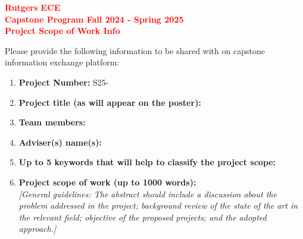 \documentclass{article}
\begin{document}
\begin{center}
    \textcolor{red}{\textbf{\Large Rutgers ECE}} \\

    \vspace{1em}
    \textcolor{red}{\textbf{\Large Capstone Program Fall 2024 - Spring 2025}} \\

    \vspace{1em}
    \textcolor{red}{\textbf{\Large Project Scope of Work Info}} \\
\end{center}

\vspace{1em}
\noindent Please provide the following information to be shared with on capstone information exchange platform:

\vspace{2em}
\begin{enumerate}[leftmargin=1.5cm]
    \item \textbf{\large Project Number:} S25-\\
    
    \vspace{1em}

    \item \textbf{\large  Project title (as will appear on the poster):} \\
    
    \vspace{1em}

    \item \textbf{\large Team members:} \\
    
    \vspace{1em}

    \item \textbf{\large Adviser(s) name(s):} \\
    
    \vspace{1em}

    \item \textbf{\large Up to 5 keywords that will help to classify the project scope:} \\
    
    \vspace{1em}

    \item \textbf{\large Project scope of work (up to 1000 words):} \\
    \textit{[General guidelines: The abstract should include a discussion about the problem addressed in the project; background review of the state of the art in the relevant field; objective of the proposed projects; and the adopted approach.]}
\end{enumerate}
\end{document}

